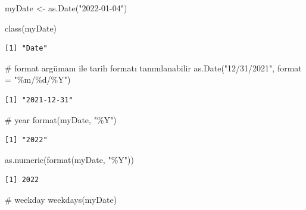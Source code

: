 \documentclass[
  letterpaper,
  DIV=11,
  numbers=noendperiod]{scrreprt}
\newenvironment{Shaded}{\begin{snugshade}}{\end{snugshade}}
\newcommand{\AttributeTok}[1]{\textcolor[rgb]{0.40,0.45,0.13}{#1}}
\newcommand{\CommentTok}[1]{\textcolor[rgb]{0.37,0.37,0.37}{#1}}
\newcommand{\FunctionTok}[1]{\textcolor[rgb]{0.28,0.35,0.67}{#1}}
\newcommand{\NormalTok}[1]{\textcolor[rgb]{0.00,0.23,0.31}{#1}}
\newcommand{\OtherTok}[1]{\textcolor[rgb]{0.00,0.23,0.31}{#1}}
\newcommand{\StringTok}[1]{\textcolor[rgb]{0.13,0.47,0.30}{#1}}
\begin{document}
\begin{Shaded}
\begin{Highlighting}[]
\NormalTok{myDate }\OtherTok{\textless{}{-}} \FunctionTok{as.Date}\NormalTok{(}\StringTok{"2022{-}01{-}04"}\NormalTok{)}

\FunctionTok{class}\NormalTok{(myDate)}
\end{Highlighting}
\end{Shaded}

\begin{verbatim}
[1] "Date"
\end{verbatim}

\begin{Shaded}
\begin{Highlighting}[]
\CommentTok{\# format argümanı ile tarih formatı tanımlanabilir}
\FunctionTok{as.Date}\NormalTok{(}\StringTok{"12/31/2021"}\NormalTok{, }\AttributeTok{format =} \StringTok{"\%m/\%d/\%Y"}\NormalTok{)}
\end{Highlighting}
\end{Shaded}

\begin{verbatim}
[1] "2021-12-31"
\end{verbatim}

\begin{Shaded}
\begin{Highlighting}[]
\CommentTok{\# year}
\FunctionTok{format}\NormalTok{(myDate, }\StringTok{"\%Y"}\NormalTok{)}
\end{Highlighting}
\end{Shaded}

\begin{verbatim}
[1] "2022"
\end{verbatim}

\begin{Shaded}
\begin{Highlighting}[]
\FunctionTok{as.numeric}\NormalTok{(}\FunctionTok{format}\NormalTok{(myDate, }\StringTok{"\%Y"}\NormalTok{))}
\end{Highlighting}
\end{Shaded}

\begin{verbatim}
[1] 2022
\end{verbatim}

\begin{Shaded}
\begin{Highlighting}[]
\CommentTok{\# weekday}
\FunctionTok{weekdays}\NormalTok{(myDate)}
\end{Highlighting}
\end{Shaded}
\end{document}
